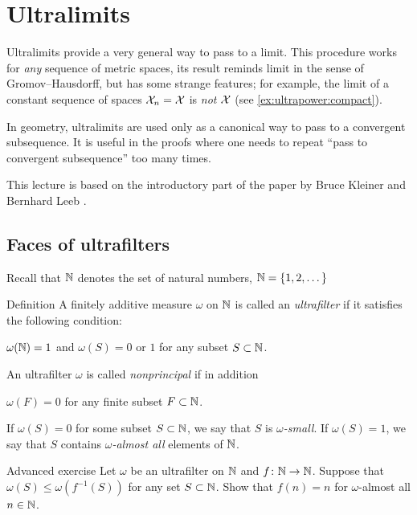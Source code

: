 \chapter{Ultralimits}

Ultralimits provide a very general way to pass to a limit.
This procedure works for \textit{any} sequence of metric spaces, its result reminds limit in the sense of Gromov--Hausdorff, but has some strange features; for example, the limit of a constant sequence of spaces $\mathcal{X}_n=\mathcal{X}$ is \textit{not} $\mathcal{X}$ (see \ref{ex:ultrapower:compact}).

In geometry, ultralimits are used only as a canonical way to pass to a convergent subsequence.
It is useful in the proofs where one needs to repeat ``pass to convergent subsequence'' too many times.

This lecture is based on the introductory part of the paper by Bruce Kleiner and Bernhard Leeb \cite{kleiner-leeb}.

\section{Faces of ultrafilters}

Recall that $\mathbb{N}$ denotes the set of natural numbers, $\mathbb{N}=\{1,2,\dots\}$

\begin{thm}{Definition}
A finitely additive measure $\omega$ 
on $\mathbb{N}$ 
is called an \emph{ultrafilter} if it satisfies the following condition:
\begin{subthm}{}
$\omega(\mathbb{N})=1$ and 
$\omega(S)=0$ or $1$ for any subset $S\subset \mathbb{N}$.
\end{subthm}
An ultrafilter $\omega$ is called 
\emph{nonprincipal} if in addition 
\begin{subthm}{}
$\omega(F)=0$ for any finite subset $F\subset \mathbb{N}$.
\end{subthm}
\end{thm}

If $\omega(S)=0$ for some subset $S\subset \mathbb{N}$,
we say that $S$ is \emph{$\omega$-small}. 
If $\omega(S)=1$, we say that $S$ contains \emph{$\omega$-almost all} elements of $\mathbb{N}$.

\begin{thm}{Advanced exercise}\label{ex:ultrakatetov}
Let $\omega$ be an ultrafilter on $\mathbb{N}$ and $f\:\NN\z\to \NN$.
Suppose that $\omega(S)\le \omega(f^{-1}(S))$ for any set $S\subset \mathbb{N}$.
Show that $f(n)=n$ for $\omega$-almost all $n\in\mathbb{N}$.
\end{thm}


